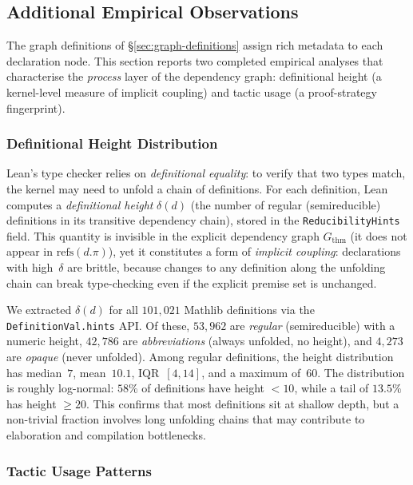 \subsection{Additional Empirical Observations}
\label{sec:additional-empirical}

The graph definitions of \S\ref{sec:graph-definitions} assign rich metadata to each declaration node. This section reports two completed empirical analyses that characterise the \emph{process} layer of the dependency graph: definitional height (a kernel-level measure of implicit coupling) and tactic usage (a proof-strategy fingerprint).

\subsubsection{Definitional Height Distribution}
\label{sec:definitional-height}

Lean's type checker relies on \emph{definitional equality}: to verify that two types match, the kernel may need to unfold a chain of definitions. For each definition, Lean computes a \emph{definitional height} $\delta(d)$ (the number of regular (semireducible) definitions in its transitive dependency chain), stored in the \texttt{ReducibilityHints} field. This quantity is invisible in the explicit dependency graph $G_{\mathrm{thm}}$ (it does not appear in $\mathrm{refs}(d.\pi)$), yet it constitutes a form of \emph{implicit coupling}: declarations with high~$\delta$ are brittle, because changes to any definition along the unfolding chain can break type-checking even if the explicit premise set is unchanged.

We extracted $\delta(d)$ for all $101{,}021$ Mathlib definitions via the \texttt{DefinitionVal.hints} API. Of these, $53{,}962$ are \emph{regular} (semireducible) with a numeric height, $42{,}786$ are \emph{abbreviations} (always unfolded, no height), and $4{,}273$ are \emph{opaque} (never unfolded). Among regular definitions, the height distribution has median~$7$, mean~$10.1$, IQR~$[4, 14]$, and a maximum of~$60$. The distribution is roughly log-normal: $58\%$ of definitions have height $< 10$, while a tail of $13.5\%$ has height $\ge 20$. This confirms that most definitions sit at shallow depth, but a non-trivial fraction involves long unfolding chains that may contribute to elaboration and compilation bottlenecks.

\subsubsection{Tactic Usage Patterns}
\label{sec:tactic-usage}


